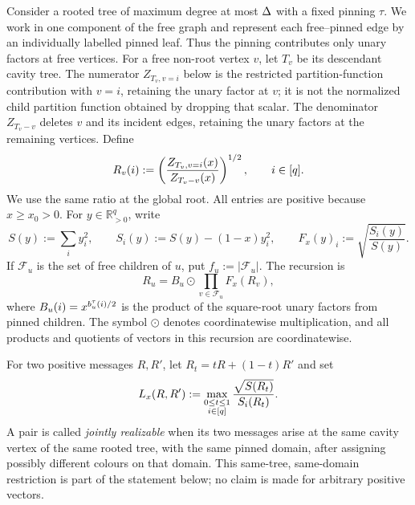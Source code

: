 Consider a rooted tree of maximum degree at most \(\Delta\) with a fixed
pinning \(\tau\).  We work in one component of
the free graph and represent each free--pinned edge by an individually
labelled pinned leaf.  Thus the pinning contributes only unary factors at
free vertices.  For a free non-root vertex \(v\), let \(T_v\) be its
descendant cavity tree.  The numerator \(Z_{T_v,v=i}\) below is the
restricted partition-function contribution with \(v=i\), retaining the
unary factor at \(v\); it is not the normalized child partition function
obtained by dropping that scalar.  The denominator \(Z_{T_v-v}\) deletes
\(v\) and its incident edges, retaining the unary factors at the remaining
vertices.  Define
\begin{equation}
 R_v(i):=\left(
   \frac{Z_{T_v,v=i}(x)}{Z_{T_v-v}(x)}
 \right)^{1/2},
 \qquad i\in[q].
 \label{eq:bbr-message}
\end{equation}
We use the same ratio at the global root.
All entries are positive because \(x\ge x_0>0\).  For
\(y\in\mathbb R_{>0}^q\), write
\begin{equation}
 S(y):=\sum_i y_i^2,\qquad
 S_i(y):=S(y)-(1-x)y_i^2,\qquad
 F_x(y)_i:=\sqrt{\frac{S_i(y)}{S(y)}}.
 \label{eq:bbr-local-map}
\end{equation}
If \(\mathcal F_u\) is the set of free children of \(u\), put
\(f_u:=|\mathcal F_u|\).  The recursion is
\begin{equation}
 R_u=B_u\odot\prod_{v\in\mathcal F_u}F_x(R_v),
 \label{eq:bbr-recursion}
\end{equation}
where \(B_u(i)=x^{b_u^\tau(i)/2}\) is the product of the
square-root unary factors from pinned children.  The symbol
$\odot$ denotes coordinatewise multiplication, and all products and
quotients of vectors in this recursion are coordinatewise.

For two positive messages \(R,R'\), let \(R_t=tR+(1-t)R'\) and set
\begin{equation}
 L_x(R,R'):=
 \max_{\substack{0\le t\le1\\ i\in[q]}}
 \frac{\sqrt{S(R_t)}}{S_i(R_t)}.
 \label{eq:bbr-segment-weight}
\end{equation}
A pair is called \emph{jointly realizable} when its two messages arise at
the same cavity vertex of the same rooted tree, with the same pinned
domain, after assigning possibly different colours on that domain.  This
same-tree, same-domain restriction is part of the statement below; no
claim is made for arbitrary positive vectors.

